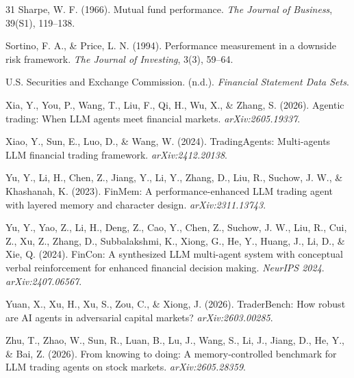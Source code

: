 \documentclass{article}
\begin{document}
\begin{thebibliography}{31}
Sharpe, W. F. (1966). Mutual fund performance. \textit{The Journal of Business}, 39(S1), 119--138.

Sortino, F. A., \& Price, L. N. (1994). Performance measurement in a downside risk framework. \textit{The Journal of Investing}, 3(3), 59--64.

U.S. Securities and Exchange Commission. (n.d.). \textit{Financial Statement Data Sets}.

Xia, Y., You, P., Wang, T., Liu, F., Qi, H., Wu, X., \& Zhang, S. (2026). Agentic trading: When LLM agents meet financial markets. \textit{arXiv:2605.19337}.

Xiao, Y., Sun, E., Luo, D., \& Wang, W. (2024). TradingAgents: Multi-agents LLM financial trading framework. \textit{arXiv:2412.20138}.

Yu, Y., Li, H., Chen, Z., Jiang, Y., Li, Y., Zhang, D., Liu, R., Suchow, J. W., \& Khashanah, K. (2023). FinMem: A performance-enhanced LLM trading agent with layered memory and character design. \textit{arXiv:2311.13743}.

Yu, Y., Yao, Z., Li, H., Deng, Z., Cao, Y., Chen, Z., Suchow, J. W., Liu, R., Cui, Z., Xu, Z., Zhang, D., Subbalakshmi, K., Xiong, G., He, Y., Huang, J., Li, D., \& Xie, Q. (2024). FinCon: A synthesized LLM multi-agent system with conceptual verbal reinforcement for enhanced financial decision making. \textit{NeurIPS 2024}. \textit{arXiv:2407.06567}.

Yuan, X., Xu, H., Xu, S., Zou, C., \& Xiong, J. (2026). TraderBench: How robust are AI agents in adversarial capital markets? \textit{arXiv:2603.00285}.

Zhu, T., Zhao, W., Sun, R., Luan, B., Lu, J., Wang, S., Li, J., Jiang, D., He, Y., \& Bai, Z. (2026). From knowing to doing: A memory-controlled benchmark for LLM trading agents on stock markets. \textit{arXiv:2605.28359}.
\end{thebibliography}
\end{document}
